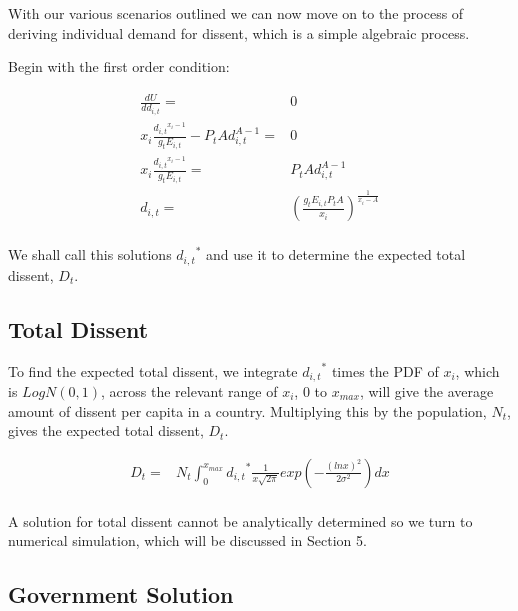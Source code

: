 \documentclass[12pt]{article}
\begin{document}
\begin{spacing}{1.5}
With our various scenarios outlined we can now move on to the process of deriving individual demand for dissent, which is a simple algebraic process. 

\vspace{1 em}
\noindent Begin with the first order condition: 

\begin{equation}
	\begin{aligned}
\frac{dU}{dd_{i,t}}=& 0\\ 
x_i \frac{{d_{i,t}}^{x_i -1}}{g_t E_{i,t}} - P_t Ad_{i,t}^{A-1}=& 0 \\
	x_i \frac{{d_{i,t}}^{x_i -1}}{g_t E_{i,t}} =& P_t Ad_{i,t}^{A-1}\\
		d_{i,t}=& \left(\frac{g_tE_{i,t}P_t A}{x_i} \right)^{\frac{1}{x_i -A}}\\ 	
	\end{aligned}
\end{equation}

We shall call this solutions ${d_{i,t}}^*$ and use it to determine the expected total dissent, $D_t$. 
     
   
\subsection{Total Dissent}

 
To find the expected total dissent, we integrate ${d_{i,t}}^*$ times the PDF of $x_i$, which is $LogN(0,1)$, across the relevant range of $x_i$, $0$ to $x_{max}$, will give the average amount of dissent per capita in a country. Multiplying this by the population, $N_t$, gives the expected total dissent, $D_t$.

\begin{equation}
	\begin{aligned}
D_t	=& N_t \int_{0}^{x_{max}} {{d}_{i,t}}^* \frac{1}{x \sqrt{2\pi}}exp  \left( -\frac{(lnx)^2}{2\sigma^2} \right)  dx \\	
	\end{aligned}
\end{equation}


A solution for total dissent cannot be analytically determined so we turn to numerical simulation, which will be discussed in Section 5. 

\subsection{Government Solution}


\end{spacing}
\end{document}
